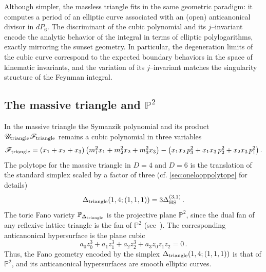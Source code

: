 \documentclass[12pt,a4paper]{article}
\theoremstyle{plain}
\theoremstyle{remark}
\newcommand{\cU}{\mathscr {U}}
\newcommand{\cF}{\mathscr {F}}
\newcommand{\Newton}{\Delta}
\newcommand{\simplexwithpars}[1]{\Newton_{\text{HS}}^{(#1)}}
\begin{document}
\medskip


Although simpler, the massless triangle fits in the same geometric
paradigm: it computes a period of an elliptic curve associated with an
(open) anticanonical divisor in $dP_6$.  The discriminant of the cubic
polynomial and its $j$--invariant encode the analytic behavior of the
integral in terms of elliptic polylogarithms, exactly mirroring the
sunset geometry.  In particular, the degeneration limits of the cubic
curve correspond to the expected boundary behaviors in the space of
kinematic invariants, and the variation of its $j$--invariant matches
the singularity structure of the Feynman integral.

\subsection{The massive triangle and $\mathbb P^2$}
\label{massive-triangle}
In the massive triangle the Symanzik polynomial and its product $\cU_{\rm triangle} \cF_{\rm triangle}$ remains a cubic polynomial in
three variables
\begin{equation}
\cF_{\rm triangle}=(x_1+x_2+x_3) \left(m_1^2x_1+m_2^2x_2+m_3^2x_3\right)-\left(x_1 x_2\, p_3^2 + x_1 x_3\, p_2^2 + x_2 x_3\, p_1^2\right).
\end{equation}
       The polytope for the massive triangle  in $D=4$ and $D=6$ is the translation of the standard simplex
       scaled by a factor of  three (cf.
\cref{sec:onelooppolytope} for details)
	   \begin{equation}\label{e:DeltaMassiveTriangle}
                  \Newton_{\rm triangle}(1,4;(1,1,1))  =3\simplexwithpars{3,1}\,. 
                \end{equation}
The toric Fano variety $\mathbb P_{\Delta_{\rm triangle}}$ is the projective plane $\mathbb{P}^2$, since the dual fan of any reflexive lattice triangle is the fan of $\mathbb{P}^2$ (see~\cite{Batyrev:1993oya,CoxKatz1999}). The  corresponding anticanonical hypersurface is the plane cubic
\begin{equation}\label{e:dP3}
a_0z_0^3 + a_1z_1^3+ a_2z_2^3 + a_3z_0z_1z_2=0\,.
\end{equation}
Thus, the Fano geometry encoded by the simplex $\Newton_{\rm triangle}(1,4;(1,1,1))$ is that of $\mathbb{P}^2$, and its anticanonical hypersurfaces are smooth elliptic curves.
\end{document}
